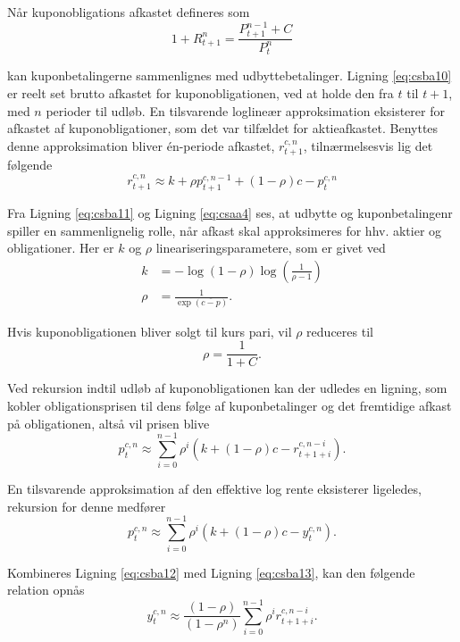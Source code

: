 \documentclass[
  a4paper,
  oneside]{memoir}
\begin{document}
Når kuponobligations afkastet defineres som
\begin{equation}
1+R_{t+1}^n = \frac{P_{t+1}^{n-1}+C}{P_t^n} \label{eq:csba10}
\end{equation}

kan kuponbetalingerne sammenlignes med udbyttebetalinger. Ligning \eqref{eq:csba10} er reelt set brutto afkastet for kuponobligationen, ved at holde den fra \(t\) til \(t+1\), med \(n\) perioder til udløb. En tilsvarende loglineær approksimation eksisterer for afkastet af kuponobligationer, som det var tilfældet for aktieafkastet. Benyttes denne approksimation bliver én-periode afkastet, \(r_{t+1}^{c,n}\), tilnærmelsesvis lig det følgende
\begin{equation}
r_{t+1}^{c,n}\approx k + \rho p_{t+1}^{c,n-1} + (1-\rho)c - p_t^{c,n} \label{eq:csba11}
\end{equation}

Fra Ligning \eqref{eq:csba11} og Ligning \eqref{eq:csaa4} ses, at udbytte og kuponbetalingenr spiller en sammenlignelig rolle, når afkast skal approksimeres for hhv. aktier og obligationer. Her er \(k\) og \(\rho\) lineariseringsparametere, som er givet ved
\begin{align*}
k &= -\log(1-\rho)\log\left(\frac{1}{\rho-1}\right)\\
\rho&= \frac{1}{\exp\left(\overline{c-p}\right)}.
\end{align*}

Hvis kuponobligationen bliver solgt til kurs pari, vil \(\rho\) reduceres til
\[\rho=\frac{1}{1+C}.\]

Ved rekursion indtil udløb af kuponobligationen kan der udledes en ligning, som kobler obligationsprisen til dens følge af kuponbetalinger og det fremtidige afkast på obligationen, altså vil prisen blive
\begin{equation}
p_t^{c,n}\approx\sum_{i=0}^{n-1} \rho^i \left(k+(1-\rho)c - r_{t+1+i}^{c,n-i}\right). \label{eq:csba12}
\end{equation}

En tilsvarende approksimation af den effektive log rente eksisterer ligeledes, rekursion for denne medfører
\begin{equation}
p_t^{c,n}\approx\sum_{i=0}^{n-1} \rho^i \left(k+(1-\rho)c - y_{t}^{c,n}\right). \label{eq:csba13}
\end{equation}

Kombineres Ligning \eqref{eq:csba12} med Ligning \eqref{eq:csba13}, kan den følgende relation opnås
\begin{equation}
y_{t}^{c,n}\approx \frac{(1-\rho)}{(1-\rho^n)}\sum_{i=0}^{n-1} \rho^i r_{t+1+i}^{c,n-i}. \label{eq:csba14}
\end{equation}
\end{document}
